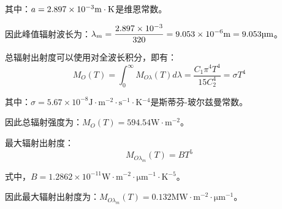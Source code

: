 \documentclass[11pt]{article}
\begin{document}
其中：$a=\rm 2.897\times 10^{-3}m\cdot K$是维恩常数。\par
因此峰值辐射波长为：$\displaystyle\lambda_m=\rm \frac{2.897\times 10^{-3}}{320}=9.053\times 10^{-6}\unit{\m}=9.053\unit{\um}$。\par
总辐射出射度可以使用对全波长积分，即有：
\begin{equation}
  M_O(T)=\int_0^\infty M_{O\lambda}(T)d\lambda=\frac{C_1\pi
    ^4T^4}{15C_2^4}=\sigma T^4
  \label{forem:总辐出度公式}
\end{equation}

其中：$\sigma=5.67\times 10^{-8} \unit{\J\cdot\m^{-2}\cdot \s^{-1}\cdot \K^{-4}}$是斯蒂芬-玻尔兹曼常数。\par
因此总辐射强度为：$M_O(T)=594.54\unit{\W\cdot \m^{-2}}$。\par
最大辐射出射度：
\begin{equation}
  M_{O\lambda_m}(T)=BT^5
  \label{forem:最大辐出度公式}
\end{equation}

式中，$B= 1.2862\times 10^{-11}\unit{\W\cdot \m^{-2}\cdot \um^{-1}\cdot \K^{-5}}$。\par
因此最大辐射出射度为：$M_{O\lambda_m}(T)=0.132\unit{\MW\cdot \m^{-2}\cdot \um^{-1}}$。
\end{document}

